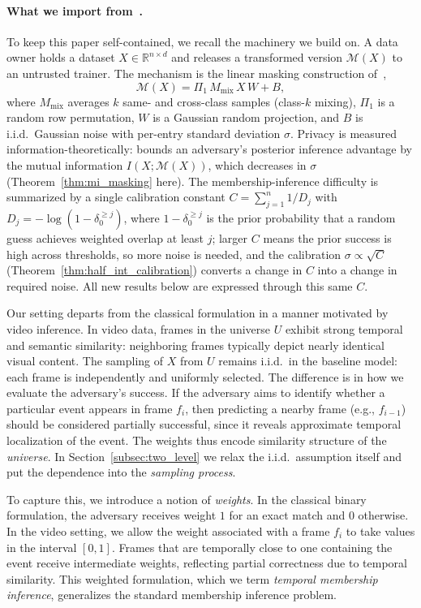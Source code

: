\documentclass[sigconf,anonymous, review]{acmart}
\begin{document}
\paragraph{What we import from~\cite{xiao2024formal}.}
To keep this paper self-contained, we recall the machinery we build on. A data owner holds a dataset $X \in \mathbb{R}^{n \times d}$ and releases a transformed version $\mathcal{M}(X)$ to an untrusted trainer. The mechanism is the linear masking construction of~\cite[Alg.~1]{xiao2024formal},
\[
\mathcal{M}(X) = \Pi_1\, M_{\mathrm{mix}}\, X\, W + B,
\]
where $M_{\mathrm{mix}}$ averages $k$ same- and cross-class samples (class-$k$ mixing), $\Pi_1$ is a random row permutation, $W$ is a Gaussian random projection, and $B$ is i.i.d.\ Gaussian noise with per-entry standard deviation $\sigma$. Privacy is measured information-theoretically: \cite{xiao2024formal} bounds an adversary's posterior inference advantage by the mutual information $I(X;\mathcal{M}(X))$, which decreases in $\sigma$ (Theorem~\ref{thm:mi_masking} here). The membership-inference difficulty is summarized by a single calibration constant $C = \sum_{j=1}^{n} 1/D_j$ with $D_j = -\log(1-\delta_0^{\ge j})$, where $1-\delta_0^{\ge j}$ is the prior probability that a random guess achieves weighted overlap at least $j$; larger $C$ means the prior success is high across thresholds, so more noise is needed, and the calibration $\sigma \propto \sqrt{C}$ (Theorem~\ref{thm:half_int_calibration}) converts a change in $C$ into a change in required noise. All new results below are expressed through this same $C$.

Our setting departs from the classical formulation in a manner motivated by video inference. In video data, frames in the universe $U$ exhibit strong temporal and semantic similarity: neighboring frames typically depict nearly identical visual content. The sampling of $X$ from $U$ remains i.i.d.\ in the baseline model: each frame is independently and uniformly selected. The difference is in how we evaluate the adversary's success. If the adversary aims to identify whether a particular event appears in frame $f_i$, then predicting a nearby frame (e.g., $f_{i-1}$) should be considered partially successful, since it reveals approximate temporal localization of the event. The weights thus encode similarity structure of the \emph{universe}. In Section~\ref{subsec:two_level} we relax the i.i.d.\ assumption itself and put the dependence into the \emph{sampling process}.

To capture this, we introduce a notion of \emph{weights}. In the classical binary formulation, the adversary receives weight \(1\) for an exact match and \(0\) otherwise. In the video setting, we allow the weight associated with a frame \(f_i\) to take values in the interval \([0,1]\). Frames that are temporally close to one containing the event receive intermediate weights, reflecting partial correctness due to temporal similarity. This weighted formulation, which we term \emph{temporal membership inference}, generalizes the standard membership inference problem.
\end{document}
